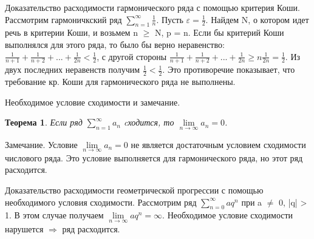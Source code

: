 \documentclass[12pt, a4paper]{article}
\newtheorem{thm}{Теорема}
\newenvironment{field}{}{\newpage}
\newif\ifnote
\newenvironment{note}{\notetrue}{\notefalse}
\begin{document}
\begin{note}
\begin{field}
Доказательство расходимости гармонического ряда с помощью критерия Коши.
\end{field}
\begin{field}
Рассмотрим гармоничкский ряд $\sum\limits_{n=1}^{\infty}\frac{1}{n}$. Пусть $\varepsilon = \frac{1}{2}$. Найдем N, о котором идет речь в критерии Коши, и возьмем n $\geq$ N, p = n. Если бы критерий Коши выполнялся для этого ряда, то было бы верно неравенство: $\frac{1}{n + 1} + \frac{1}{n + 2} + ... + \frac{1}{2n} < \frac{1}{2}$, с другой стороны $\frac{1}{n + 1} + \frac{1}{n + 2} + ... + \frac{1}{2n} \geq n\frac{1}{2n} = \frac{1}{2}$. Из двух последних неравенств получим $\frac{1}{2} < \frac{1}{2}$. Это противоречие показывает, что требование кр. Коши для гармонического ряда не выполнены.


\end{field}
\end{note}

\begin{note}
\begin{field}
Необходимое условие сходимости и замечание.
\end{field}
\begin{field}
\begin{thm}
	Если ряд $\sum\limits_{n=1}^{\infty}a_{n}$ cходится, то $\lim\limits_{n \to \infty}a_{n} = 0$.
\end{thm}
Замечание. Условие $\lim\limits_{n \to \infty}a_n = 0$ не является достаточным условием сходимости числового ряда. Это условие выполняется для гармонического ряда, но этот ряд расходится.


\end{field}
\end{note}

\begin{note}
\begin{field}
Доказательство расходимости геометрической прогрессии с помощью необходимого условия сходимости.
\end{field}
\begin{field}
Рассмотрим ряд $\sum\limits_{n=0}^{\infty}aq^n$ при a $\neq$ 0, |q| > 1. В этом случае получаем $\lim\limits_{n \to \infty}aq^n = \infty$. Необходимое условие сходимости нарушется $\Longrightarrow$ ряд расходится.

\end{field}
\end{note}
\end{document}
